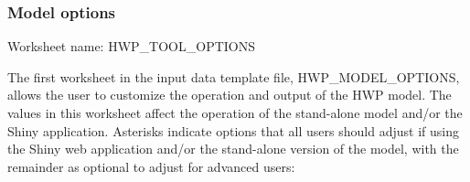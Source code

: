 \documentclass[
  openany]{book}
\begin{document}
\hypertarget{own-prov-input-options}{%
\subsubsection{Model options}\label{own-prov-input-options}}

Worksheet name: HWP\_TOOL\_OPTIONS

The first worksheet in the input data template file, HWP\_MODEL\_OPTIONS, allows the user to customize the operation and output of the HWP model. The values in this worksheet affect the operation of the stand-alone model and/or the Shiny application. Asterisks indicate options that all users should adjust if using the Shiny web application and/or the stand-alone version of the model, with the remainder as optional to adjust for advanced users:
\end{document}
